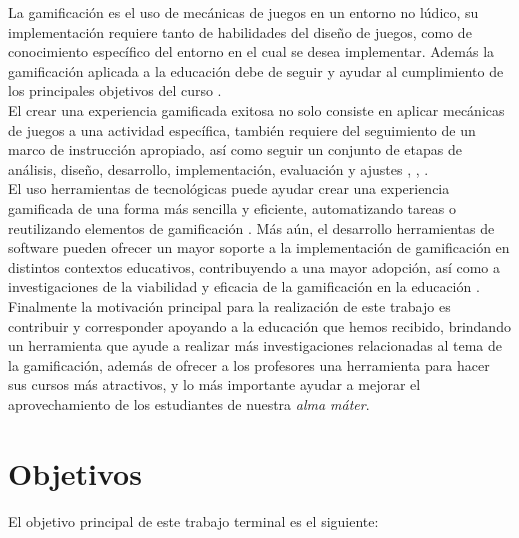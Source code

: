  \noindent La gamificación es el uso de mecánicas de juegos en un entorno no lúdico,
 su implementación requiere tanto de habilidades del diseño de juegos, como de 
 conocimiento específico del entorno en el cual se desea implementar. Además la 
 gamificación aplicada a la educación debe de seguir y ayudar al cumplimiento de los
 principales objetivos del curso \cite{ForTheWin}.\\


 \noindent El crear una experiencia gamificada exitosa no solo consiste en aplicar 
 mecánicas de juegos a una actividad específica, también requiere del seguimiento de 
 un marco de instrucción apropiado, así como seguir un conjunto de etapas de análisis,
 diseño, desarrollo, implementación, evaluación y ajustes
 \cite[p. 39]{Octalysis}, \cite[p. 1110]{GamInE-Learning}, \cite{ForTheWin}.\\


 \noindent El uso herramientas de tecnológicas puede ayudar crear una experiencia 
 gamificada de una forma más sencilla y eficiente, automatizando tareas o reutilizando
 elementos de gamificación \cite{Wood-Reiners}. Más aún, el desarrollo herramientas 
 de software pueden ofrecer un mayor soporte a la implementación de gamificación 
 en distintos contextos educativos, contribuyendo a una mayor adopción, así como a 
 investigaciones de la viabilidad y eficacia de la gamificación en la educación 
 \cite[p. 10]{mappingStudy}.\\


 \noindent Finalmente la motivación principal para la realización de este trabajo es
 contribuir y corresponder apoyando a la educación que hemos recibido, brindando un 
 herramienta que ayude a realizar más investigaciones relacionadas al tema de la 
 gamificación, además de ofrecer a los profesores una herramienta para hacer sus
 cursos más atractivos, y lo más importante ayudar a mejorar el aprovechamiento de 
 los estudiantes de nuestra {\it alma máter}.

\section{Objetivos} \label{sec:objetivos}

 \noindent El objetivo principal de este trabajo terminal es el siguiente:

